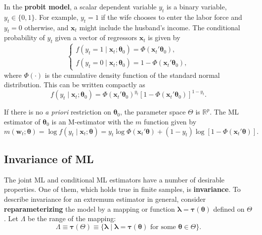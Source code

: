 \begin{example}[Probit]
\label{ex:7.3}
In the \textbf{probit model}, a scalar dependent variable $y_t$ is a binary variable, $y_t \in \{0, 1\}$. For example, $y_t = 1$ if the wife chooses to enter the labor force and $y_t = 0$ otherwise, and $\mathbf{x}_t$ might include the husband's income. The conditional probability of $y_t$ given a vector of regressors $\mathbf{x}_t$ is given by
\begin{equation}
\label{eq:7.1.14}
\begin{cases}
f(y_t = 1 \mid \mathbf{x}_t; \bm{\theta}_0) = \Phi(\mathbf{x}_t' \bm{\theta}_0), \\
f(y_t = 0 \mid \mathbf{x}_t; \bm{\theta}_0) = 1 - \Phi(\mathbf{x}_t' \bm{\theta}_0),
\end{cases}
\end{equation}
where $\Phi(\cdot)$ is the cumulative density function of the standard normal distribution. This can be written compactly as
\[
f(y_t \mid \mathbf{x}_t; \bm{\theta}_0) = \Phi(\mathbf{x}_t' \bm{\theta}_0)^{y_t} [1 - \Phi(\mathbf{x}_t' \bm{\theta}_0)]^{1 - y_t}.
\]

If there is no \emph{a priori} restriction on $\bm{\theta}_0$, the parameter space $\Theta$ is $\mathbb{R}^p$. The ML estimator of $\bm{\theta}_0$ is an M-estimator with the $m$ function given by
\begin{equation}
\label{eq:7.1.15}
m(\mathbf{w}_t; \bm{\theta}) = \log f(y_t \mid \mathbf{x}_t; \bm{\theta}) = y_t \log \Phi(\mathbf{x}_t' \bm{\theta}) + (1 - y_t) \log[1 - \Phi(\mathbf{x}_t' \bm{\theta})].
\end{equation}
\end{example}

\subsection*{Invariance of ML}

The joint ML and conditional ML estimators have a number of desirable properties. One of them, which holds true in finite samples, is \textbf{invariance}. To describe invariance for an extremum estimator in general, consider \textbf{reparameterizing} the model by a mapping or function $\bm{\lambda} = \bm{\tau}(\bm{\theta})$ defined on $\Theta$. Let $\Lambda$ be the range of the mapping:
\begin{equation}
\label{eq:7.1.16}
\Lambda \equiv \bm{\tau}(\Theta) \equiv \{ \bm{\lambda} \mid \bm{\lambda} = \bm{\tau}(\bm{\theta}) \text{ for some } \bm{\theta} \in \Theta \}.
\end{equation}

